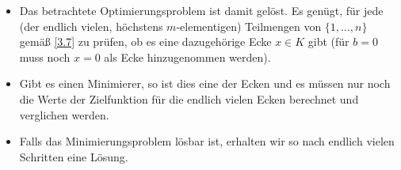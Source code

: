 \begin{nt} \label{3.9}
	\begin{itemize}
		\item
			Das betrachtete Optimierungsproblem ist damit gelöst.
			Es genügt, für jede (der endlich vielen, höchstens $m$-elementigen) Teilmengen von $\{1, \dotsc, n\}$ gemäß \ref{3.7} zu prüfen, ob es eine dazugehörige Ecke $x \in K$ gibt (für $b = 0$ muss noch $x = 0$ als Ecke hinzugenommen werden).
		\item
			Gibt es einen Minimierer, so ist dies eine der Ecken und es müssen nur noch die Werte der Zielfunktion für die endlich vielen Ecken berechnet und verglichen werden.
		\item
			Falls das Minimierungsproblem lösbar ist, erhalten wir so nach endlich vielen Schritten eine Lösung.
	\end{itemize}
\end{nt}

